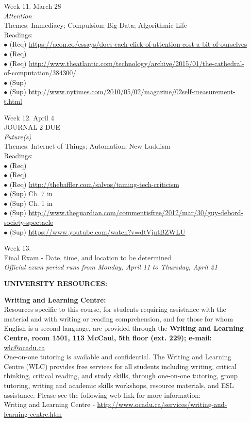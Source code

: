 \documentclass[10pt]{article}
\begin{document}
Week 11. March 28 \\
\textit{Attention} \\
Themes: Immediacy; Compulsion; Big Data; Algorithmic Life \\
	Readings: \\
	$\bullet$ (Req) \url{https://aeon.co/essays/does-each-click-of-attention-cost-a-bit-of-ourselves}\\
	$\bullet$ (Req) \\
	$\bullet$ (Req) \url{http://www.theatlantic.com/technology/archive/2015/01/the-cathedral-of-computation/384300/}\\
	$\bullet$ (Sup) \\
	$\bullet$ (Sup) \url{http://www.nytimes.com/2010/05/02/magazine/02self-measurement-t.html}

Week 12. April 4 \\
JOURNAL 2 DUE \\
\textit{Future(s)} \\
Themes: Internet of Things; Automation; New Luddism \\
	Readings: \\
	$\bullet$ (Req)  \\
	$\bullet$ (Req) \\
	$\bullet$ (Req) \url{http://thebaffler.com/salvos/taming-tech-criticism}\\
	$\bullet$ (Sup) Ch. 7 in \\
    $\bullet$ (Sup) Ch. 1 in \\
    $\bullet$ (Sup) \url{http://www.theguardian.com/commentisfree/2012/mar/30/guy-debord-society-spectacle}\\
    $\bullet$ (Sup) \url{https://www.youtube.com/watch?v=dtVjutBZWLU}

Week 13. \\
Final Exam - Date, time, and location to be determined \\
\textit{Official exam period runs from Monday, April 11 to Thursday, April 21     }

\textbf{UNIVERSITY RESOURCES:}

\textbf{Writing and Learning Centre:}\\
Resources specific to this course, for students requiring assistance with the material and with writing or reading comprehension, and for those for whom English is a second language, are provided through the \textbf{Writing and Learning Centre, room 1501, 113 McCaul, 5th floor (ext. 229); e-mail:} \href{mailto:wlc@ocadu.ca}{wlc@ocadu.ca}\\  One-on-one tutoring is available and confidential.  The Writing and Learning Centre (WLC) provides free services for all students including writing, critical thinking, critical reading, and study skills, through one-on-one tutoring, group tutoring, writing and academic skills workshops, resource materials, and ESL assistance.  Please see the following web link for more information:\\ Writing and Learning Centre - \url{http://www.ocadu.ca/services/writing-and-learning-centre.htm} 
\end{document}
